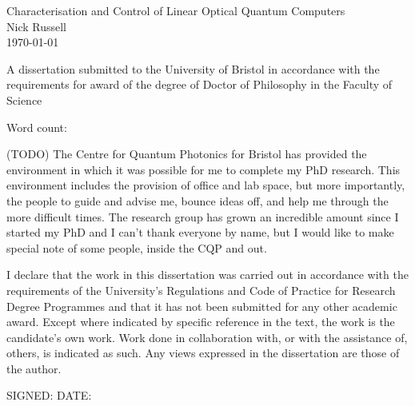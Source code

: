 \begin{titlepage}
  \begin{center}
    {\LARGE Characterisation and Control of Linear Optical Quantum Computers}
\\[1.5cm]
    {\Large Nick Russell}\\[1.5cm]
    {\today}\\[12.0cm]
  \end{center}
  \begin{flushleft}
    {A dissertation submitted to the University of Bristol in accordance with
    the requirements for award of the degree of Doctor of Philosophy in the
    Faculty of Science}
  \end{flushleft}
  \begin{flushright}
    Word count: 
  \end{flushright}
\end{titlepage}

\begin{abstract}
  (TODO) Each copy must include an abstract or summary of the dissertation in not more
  than 300 words, on one side of A4, which should be single-spaced in a font
  size in the range 10 to 12.
\end{abstract}

\begin{acknowledgements}
  (TODO) The Centre for Quantum Photonics for Bristol has provided the environment in
  which it was possible for me to complete my PhD research. This environment
  includes the provision of office and lab space, but more importantly, the
  people to guide and advise me, bounce ideas off, and help me through the more
  difficult times. The research group has grown an incredible amount since I
  started my PhD and I can't thank everyone by name, but I would like to make
  special note of some people, inside the CQP and out.
\end{acknowledgements}

\begin{declaration}
  I declare that the work in this dissertation was carried out in accordance
  with the requirements of the University's Regulations and Code of Practice for
  Research Degree Programmes and that it has not been submitted for any other
  academic award. Except where indicated by specific reference in the text, the
  work is the candidate's own work. Work done in collaboration with, or with the
  assistance of, others, is indicated as such. Any views expressed in the
  dissertation are those of the author.

  SIGNED: \dotfill DATE: \dotfill
\end{declaration}

\tableofcontents
\listoffigures

